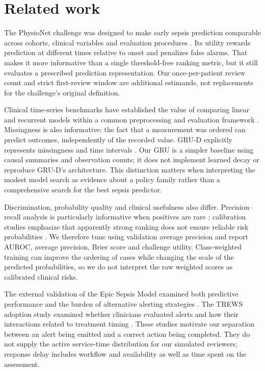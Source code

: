 \section*{Related work}
The PhysioNet challenge was designed to make early sepsis prediction comparable across cohorts, clinical variables and evaluation procedures \citep{reyna2020}. Its utility rewards prediction at different times relative to onset and penalizes false alarms. That makes it more informative than a single threshold-free ranking metric, but it still evaluates a prescribed prediction representation. Our once-per-patient review count and strict first-review window are additional estimands, not replacements for the challenge's original definition.

Clinical time-series benchmarks have established the value of comparing linear and recurrent models within a common preprocessing and evaluation framework \citep{harutyunyan2019}. Missingness is also informative: the fact that a measurement was ordered can predict outcomes, independently of the recorded value. GRU-D explicitly represents missingness and time intervals \citep{che2018}. Our GRU is a simpler baseline using causal summaries and observation counts; it does not implement learned decay or reproduce GRU-D's architecture. This distinction matters when interpreting the modest model search as evidence about a policy family rather than a comprehensive search for the best sepsis predictor.

Discrimination, probability quality and clinical usefulness also differ. Precision--recall analysis is particularly informative when positives are rare \citep{saito2015}; calibration studies emphasize that apparently strong ranking does not ensure reliable risk probabilities \citep{vancalster2019}. We therefore tune using validation average precision and report AUROC, average precision, Brier score and challenge utility. Class-weighted training can improve the ordering of cases while changing the scale of the predicted probabilities, so we do not interpret the raw weighted scores as calibrated clinical risks.

The external validation of the Epic Sepsis Model examined both predictive performance and the burden of alternative alerting strategies \citep{wong2021}. The TREWS adoption study examined whether clinicians evaluated alerts and how their interactions related to treatment timing \citep{trews}. These studies motivate our separation between an alert being emitted and a correct action being completed. They do not supply the active service-time distribution for our simulated reviewers; response delay includes workflow and availability as well as time spent on the assessment.

